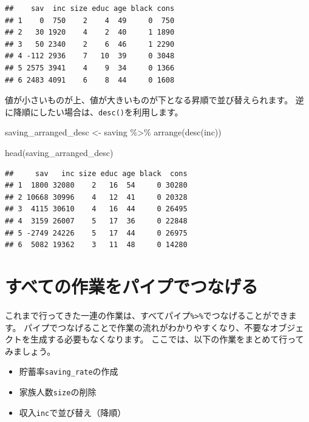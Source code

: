 \documentclass[
]{book}
\newenvironment{Shaded}{\begin{snugshade}}{\end{snugshade}}
\newcommand{\FunctionTok}[1]{\textcolor[rgb]{0.00,0.00,0.00}{#1}}
\newcommand{\NormalTok}[1]{#1}
\newcommand{\OtherTok}[1]{\textcolor[rgb]{0.56,0.35,0.01}{#1}}
\newcommand{\SpecialCharTok}[1]{\textcolor[rgb]{0.00,0.00,0.00}{#1}}
\providecommand{\tightlist}{%
  \setlength{\itemsep}{0pt}\setlength{\parskip}{0pt}}
\begin{document}
\begin{verbatim}
##    sav  inc size educ age black cons
## 1    0  750    2    4  49     0  750
## 2   30 1920    4    2  40     1 1890
## 3   50 2340    2    6  46     1 2290
## 4 -112 2936    7   10  39     0 3048
## 5 2575 3941    4    9  34     0 1366
## 6 2483 4091    6    8  44     0 1608
\end{verbatim}

値が小さいものが上、値が大きいものが下となる昇順で並び替えられます。
逆に降順にしたい場合は、\texttt{desc()}を利用します。

\begin{Shaded}
\begin{Highlighting}[]
\NormalTok{saving\_arranged\_desc }\OtherTok{\textless{}{-}}
\NormalTok{  saving }\SpecialCharTok{\%\textgreater{}\%}
    \FunctionTok{arrange}\NormalTok{(}\FunctionTok{desc}\NormalTok{(inc))}

\FunctionTok{head}\NormalTok{(saving\_arranged\_desc)}
\end{Highlighting}
\end{Shaded}

\begin{verbatim}
##     sav   inc size educ age black  cons
## 1  1800 32080    2   16  54     0 30280
## 2 10668 30996    4   12  41     0 20328
## 3  4115 30610    4   16  44     0 26495
## 4  3159 26007    5   17  36     0 22848
## 5 -2749 24226    5   17  44     0 26975
## 6  5082 19362    3   11  48     0 14280
\end{verbatim}

\hypertarget{ux3059ux3079ux3066ux306eux4f5cux696dux3092ux30d1ux30a4ux30d7ux3067ux3064ux306aux3052ux308b}{%
\section{すべての作業をパイプでつなげる}\label{ux3059ux3079ux3066ux306eux4f5cux696dux3092ux30d1ux30a4ux30d7ux3067ux3064ux306aux3052ux308b}}

これまで行ってきた一連の作業は、すべてパイプ\texttt{\%\textgreater{}\%}でつなげることができます。
パイプでつなげることで作業の流れがわかりやすくなり、不要なオブジェクトを生成する必要もなくなります。
ここでは、以下の作業をまとめて行ってみましょう。

\begin{itemize}
\tightlist
\item
  貯蓄率\texttt{saving\_rate}の作成
\item
  家族人数\texttt{size}の削除
\item
  収入\texttt{inc}で並び替え（降順）
\end{itemize}
\end{document}
